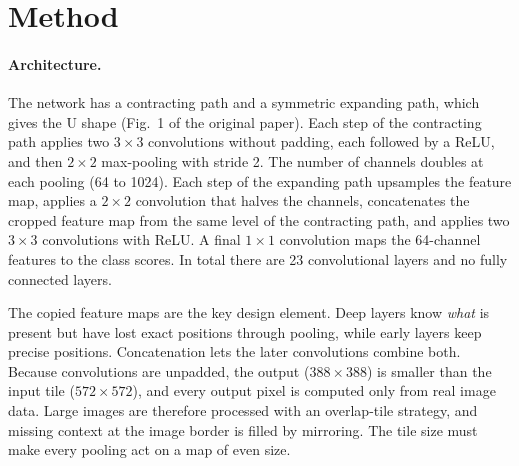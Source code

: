 \documentclass[10pt,twocolumn]{article}
\begin{document}
\section{Method}
\paragraph{Architecture.} The network has a contracting path and a symmetric expanding path, which gives the U shape (Fig.~1 of the original paper). Each step of the contracting path applies two $3\times3$ convolutions without padding, each followed by a ReLU, and then $2\times2$ max-pooling with stride 2. The number of channels doubles at each pooling (64 to 1024). Each step of the expanding path upsamples the feature map, applies a $2\times2$ convolution that halves the channels, concatenates the cropped feature map from the same level of the contracting path, and applies two $3\times3$ convolutions with ReLU. A final $1\times1$ convolution maps the 64-channel features to the class scores. In total there are 23 convolutional layers and no fully connected layers.

The copied feature maps are the key design element. Deep layers know \emph{what} is present but have lost exact positions through pooling, while early layers keep precise positions. Concatenation lets the later convolutions combine both. Because convolutions are unpadded, the output ($388\times388$) is smaller than the input tile ($572\times572$), and every output pixel is computed only from real image data. Large images are therefore processed with an overlap-tile strategy, and missing context at the image border is filled by mirroring. The tile size must make every pooling act on a map of even size.
\end{document}
